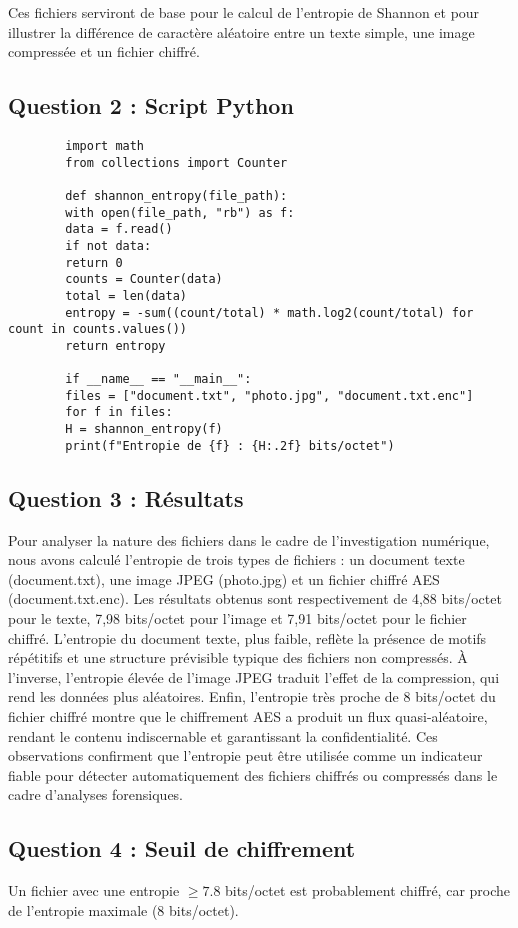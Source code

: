 \documentclass[12pt,a4paper]{report}
\begin{document}
	Ces fichiers serviront de base pour le calcul de l’entropie de Shannon et pour illustrer la différence de caractère aléatoire entre un texte simple, une image compressée et un fichier chiffré.
	
	
	\subsection*{Question 2 : Script Python}

	
	\begin{lstlisting}
		import math
		from collections import Counter
		
		def shannon_entropy(file_path):
		with open(file_path, "rb") as f:
		data = f.read()
		if not data:
		return 0
		counts = Counter(data)
		total = len(data)
		entropy = -sum((count/total) * math.log2(count/total) for count in counts.values())
		return entropy
		
		if __name__ == "__main__":
		files = ["document.txt", "photo.jpg", "document.txt.enc"] 
		for f in files:
		H = shannon_entropy(f)
		print(f"Entropie de {f} : {H:.2f} bits/octet")
	\end{lstlisting}
	
	
	\subsection*{Question 3 : Résultats}
	Pour analyser la nature des fichiers dans le cadre de l’investigation numérique, nous avons calculé l’entropie de trois types de fichiers : un document texte (document.txt), une image JPEG (photo.jpg) et un fichier chiffré AES (document.txt.enc). Les résultats obtenus sont respectivement de 4,88 bits/octet pour le texte, 7,98 bits/octet pour l’image et 7,91 bits/octet pour le fichier chiffré. L’entropie du document texte, plus faible, reflète la présence de motifs répétitifs et une structure prévisible typique des fichiers non compressés. À l’inverse, l’entropie élevée de l’image JPEG traduit l’effet de la compression, qui rend les données plus aléatoires. Enfin, l’entropie très proche de 8 bits/octet du fichier chiffré montre que le chiffrement AES a produit un flux quasi-aléatoire, rendant le contenu indiscernable et garantissant la confidentialité. Ces observations confirment que l’entropie peut être utilisée comme un indicateur fiable pour détecter automatiquement des fichiers chiffrés ou compressés dans le cadre d’analyses forensiques.
	
	\subsection*{Question 4 : Seuil de chiffrement}
	Un fichier avec une entropie \( \geq 7.8 \) bits/octet est probablement chiffré, car proche de l'entropie maximale (8 bits/octet).
	
\end{document}
